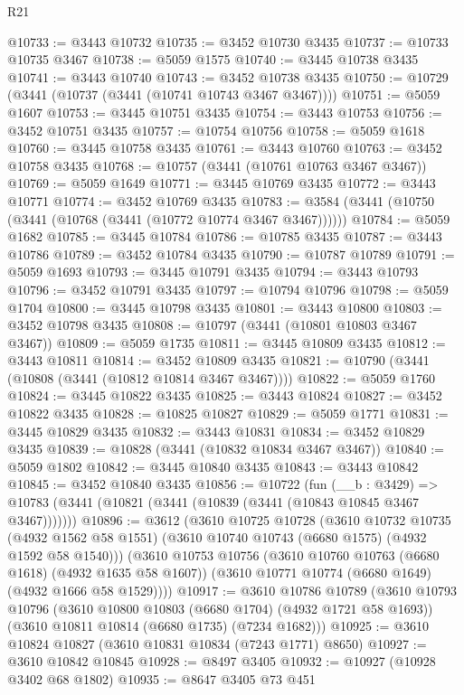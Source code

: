 \begin{lexlean}{R21}
\begin{coremodule}
@10733 := @3443 @10732
@10735 := @3452 @10730 @3435
@10737 := @10733 @10735 @3467
@10738 := @5059 @1575
@10740 := @3445 @10738 @3435
@10741 := @3443 @10740
@10743 := @3452 @10738 @3435
@10750 := @10729 (@3441 (@10737 (@3441 (@10741 @10743 @3467 @3467))))
@10751 := @5059 @1607
@10753 := @3445 @10751 @3435
@10754 := @3443 @10753
@10756 := @3452 @10751 @3435
@10757 := @10754 @10756
@10758 := @5059 @1618
@10760 := @3445 @10758 @3435
@10761 := @3443 @10760
@10763 := @3452 @10758 @3435
@10768 := @10757 (@3441 (@10761 @10763 @3467 @3467))
@10769 := @5059 @1649
@10771 := @3445 @10769 @3435
@10772 := @3443 @10771
@10774 := @3452 @10769 @3435
@10783 := @3584 (@3441 (@10750 (@3441 (@10768 (@3441 (@10772 @10774 @3467 @3467))))))
@10784 := @5059 @1682
@10785 := @3445 @10784
@10786 := @10785 @3435
@10787 := @3443 @10786
@10789 := @3452 @10784 @3435
@10790 := @10787 @10789
@10791 := @5059 @1693
@10793 := @3445 @10791 @3435
@10794 := @3443 @10793
@10796 := @3452 @10791 @3435
@10797 := @10794 @10796
@10798 := @5059 @1704
@10800 := @3445 @10798 @3435
@10801 := @3443 @10800
@10803 := @3452 @10798 @3435
@10808 := @10797 (@3441 (@10801 @10803 @3467 @3467))
@10809 := @5059 @1735
@10811 := @3445 @10809 @3435
@10812 := @3443 @10811
@10814 := @3452 @10809 @3435
@10821 := @10790 (@3441 (@10808 (@3441 (@10812 @10814 @3467 @3467))))
@10822 := @5059 @1760
@10824 := @3445 @10822 @3435
@10825 := @3443 @10824
@10827 := @3452 @10822 @3435
@10828 := @10825 @10827
@10829 := @5059 @1771
@10831 := @3445 @10829 @3435
@10832 := @3443 @10831
@10834 := @3452 @10829 @3435
@10839 := @10828 (@3441 (@10832 @10834 @3467 @3467))
@10840 := @5059 @1802
@10842 := @3445 @10840 @3435
@10843 := @3443 @10842
@10845 := @3452 @10840 @3435
@10856 := @10722
    (fun (__b : @3429) =>
    @10783 (@3441 (@10821 (@3441 (@10839 (@3441 (@10843 @10845 @3467 @3467)))))))
@10896 := @3612
    (@3610
      @10725
      @10728
      (@3610
        @10732
        @10735
        (@4932 @1562 @58 @1551)
        (@3610 @10740 @10743 (@6680 @1575) (@4932 @1592 @58 @1540)))
      (@3610
        @10753
        @10756
        (@3610 @10760 @10763 (@6680 @1618) (@4932 @1635 @58 @1607))
        (@3610 @10771 @10774 (@6680 @1649) (@4932 @1666 @58 @1529))))
@10917 := @3610
    @10786
    @10789
    (@3610
      @10793
      @10796
      (@3610 @10800 @10803 (@6680 @1704) (@4932 @1721 @58 @1693))
      (@3610 @10811 @10814 (@6680 @1735) (@7234 @1682)))
@10925 := @3610 @10824 @10827 (@3610 @10831 @10834 (@7243 @1771) @8650)
@10927 := @3610 @10842 @10845
@10928 := @8497 @3405
@10932 := @10927 (@10928 @3402 @68 @1802)
@10935 := @8647 @3405 @73 @451

\end{coremodule}
\end{lexlean}
